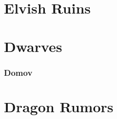 

\begin{multicols}{2}

\section{Elvish Ruins}


\section{Dwarves}


\subsubsection{Domov}


\section{Dragon Rumors}


\end{multicols}

